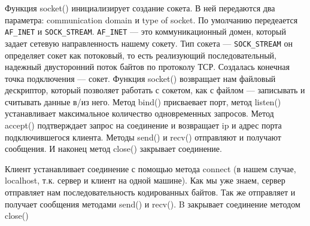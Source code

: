 \documentclass[a4paper]{article}
\begin{document}
\begin{figure}[h]
\end{figure}

Функция socket() инициализирует создание сокета. В ней передаются два параметра: communication domain и type of socket. По умолчанию передеается \verb!AF_INET! и \verb!SOCK_STREAM!. \verb!AF_INET! --- это коммуникационный домен, который задает сетевую направленность нашему сокету. Тип сокета --- \verb!SOCK_STREAM! он определяет сокет как потоковый, то есть реализующий последовательный, надежный двусторонний поток байтов по протоколу ТСР. Создалась конечная точка подключения --- сокет. Функция socket() возвращает нам файловый дескриптор, который позволяет работать с сокетом, как с файлом — записывать и считывать данные в/из него. Метод bind() присваевает порт, метод listen() устанавливает максимальное количество одновременных  запросов. Метод accept() подтверждает запрос на соединение и возвращает ip и адрес порта подключившегося клиента. Методы send() и recv() отправляют и получают сообщения. И наконец метод close() закрывает соединение.

Клиент устанавливает соединение с помощью метода connect (в нашем случае, localhost, т.к. сервер и клиент на одной машине). Как мы уже знаем, сервер отправляет нам последовательность кодированных байтов. Так же отправляет и получает сообщения методами send() и recv(). B закрывает соединение методом close()
\end{document}
